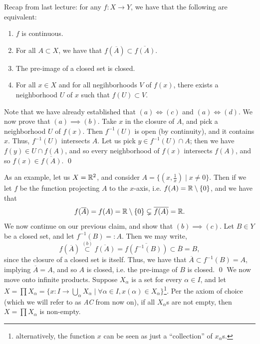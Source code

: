 \noindent Recap from last lecture: for any $f : X \to Y$, we have that the following are equivalent:
\begin{enumerate}[label=(\alph*)]
    \item $f$ is continuous.
    \item For all $A \subset X$, we have that $f(\overline{A}) \subset \overline{f(A)}$.
    \item The pre-image of a closed set is closed.
    \item For all $x \in X$ and for all negihborhoods $V$ of $f(x)$, there exists a neighborhood $U$ of $x$ such that $f(U) \subset V$.
\end{enumerate}
Note that we have already established that $(a) \iff (c)$ and $(a) \iff (d)$. We now prove that $(a) \implies (b)$.
\medskip\newline
\noindent Take $x$ in the closure of $A$, and pick a neighborhood $U$ of $f(x)$. Then $f^{-1}(U)$ is open (by continuity), and it contains $x$. Thus, $f^{-1}(U)$ intersects $A$. Let us pick $y \in f^{-1}(U) \cap A$; then we have $f(y) \in U \cap f(A)$, and so every neighborhood of $f(x)$ intersects $f(A)$, and so $f(x) \in \overline{f(A)}$. \qed

\newpage
\noindent As an example, let us $X = \mathbb R^2$, and consider $A = \{(x, \frac{1}{x}) \mid x \neq 0\}$. Then if we let $f$ be the function projecting $A$ to the $x$-axis, i.e. $f(A) = \mathbb R \setminus \{0\}$, and we have that
\[ f(\overline{A}) = f(A) = \mathbb R \setminus\{0\} \subsetneq \overline{f(A)} = \mathbb R. \]
We now continue on our previous claim, and show that $(b) \implies (c)$. Let $B \in Y$ be a closed set, and let $f^{-1}(B) =: A$. Then we may write,
\[ f(\overline{A}) \stackrel{(b)}{\subset} \overline{f(A)} = \overline{f(f^{-1}(B))} \subset \overline{B} = B, \]
since the closure of a closed set is itself. Thus, we have that $\overline{A} \subset f^{-1}(B) = A$, implying $\overline{A} = A$, and so $A$ is closed, i.e. the pre-image of $B$ is closed. \qed
\medskip\newline
\noindent We now move onto infinite products. Suppose $X_\alpha$ is a set for every $\alpha \in I$, and let $X = \prod X_\alpha = \{ x : I \to \bigcup_\alpha X_\alpha \mid \forall \alpha \in I, x(\alpha) \in X_\alpha \}$\footnote{alternatively, the function $x$ can be seen as just a ``collection'' of $x_\alpha$s.}. Per the axiom of choice (which we will refer to as \textit{AC} from now on), if all $X_\alpha$s are not empty, then $X = \prod X_\alpha$ is non-empty.

